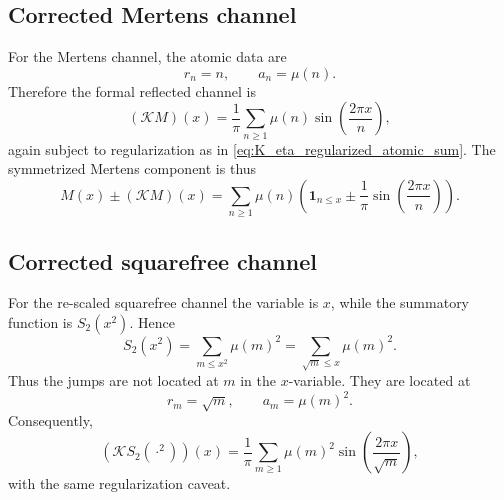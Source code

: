 \documentclass[11pt]{amsart}
\numberwithin{equation}{section}
\theoremstyle{plain}
\theoremstyle{definition}
\theoremstyle{remark}
\begin{document}
\subsection{Corrected Mertens channel}
\label{subsec:corrected_mertens_channel}

For the Mertens channel, the atomic data are
\begin{equation}
r_n=n,
\qquad
a_n=\mu(n).
\label{eq:mertens_atomic_data}
\end{equation}
Therefore the formal reflected channel is
\begin{equation}
(\mathcal K M)(x)=\frac1\pi\sum_{n\ge1}\mu(n)\sin\left(\frac{2\pi x}{n}\right),
\label{eq:K_M_corrected}
\end{equation}
again subject to regularization as in \eqref{eq:K_eta_regularized_atomic_sum}.  The symmetrized Mertens component is thus
\begin{equation}
M(x)\pm(\mathcal K M)(x)
=\sum_{n\ge1}\mu(n)\left(\mathbf 1_{n\le x}\pm\frac1\pi\sin\left(\frac{2\pi x}{n}\right)\right).
\label{eq:mertens_symmetrized_sine_weight}
\end{equation}

\subsection{Corrected squarefree channel}
\label{subsec:corrected_squarefree_channel}

For the re-scaled squarefree channel the variable is \(x\), while the summatory function is \(S_2(x^2)\).  Hence
\begin{equation}
S_2(x^2)=\sum_{m\le x^2}\mu(m)^2=\sum_{\sqrt m\le x}\mu(m)^2.
\label{eq:S2_x2_as_sqrt_jumps}
\end{equation}
Thus the jumps are not located at \(m\) in the \(x\)-variable.  They are located at
\begin{equation}
r_m=\sqrt m,
\qquad
a_m=\mu(m)^2.
\label{eq:squarefree_atomic_data_uncentered}
\end{equation}
Consequently,
\begin{equation}
(\mathcal K S_2(\cdot^2))(x)=\frac1\pi\sum_{m\ge1}\mu(m)^2\sin\left(\frac{2\pi x}{\sqrt m}\right),
\label{eq:K_S2_x2_corrected}
\end{equation}
with the same regularization caveat.
\end{document}
